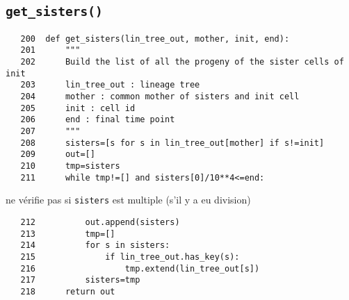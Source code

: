 \documentclass{article}
\def \mycolor {red}
\begin{document}
\subsection{\texttt{get\_sisters()}}
\label{sec:get:sisters}
\begin{verbatim} 
   200	def get_sisters(lin_tree_out, mother, init, end):
   201	    """
   202	    Build the list of all the progeny of the sister cells of init
   203	    lin_tree_out : lineage tree
   204	    mother : common mother of sisters and init cell
   205	    init : cell id
   206	    end : final time point
   207	    """
   208	    sisters=[s for s in lin_tree_out[mother] if s!=init]
   209	    out=[]
   210	    tmp=sisters
   211	    while tmp!=[] and sisters[0]/10**4<=end:
\end{verbatim} 
\color{\mycolor}
ne v\'erifie pas si \verb|sisters| est multiple (s'il y a eu division)
\color{black}
\begin{verbatim}
   212	        out.append(sisters)
   213	        tmp=[]
   214	        for s in sisters:
   215	            if lin_tree_out.has_key(s):
   216	                tmp.extend(lin_tree_out[s])
   217	        sisters=tmp
   218	    return out
\end{verbatim}
\end{document}
